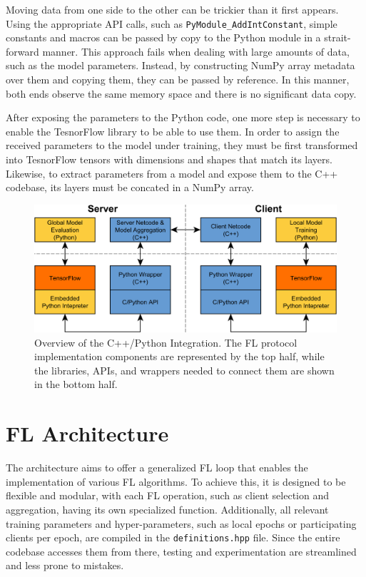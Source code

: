 Moving data from one side to the other can be trickier than it first appears. Using the appropriate API calls, such as \texttt{PyModule\_AddIntConstant}, simple constants and macros can be passed by copy to the Python module in a strait-forward manner. This approach fails when dealing with large amounts of data, such as the model parameters. Instead, by constructing NumPy array metadata over them and copying them, they can be passed by reference. In this manner, both ends observe the same memory space and there is no significant data copy.

After exposing the parameters to the Python code, one more step is necessary to enable the TesnorFlow library to be able to use them. In order to assign the received parameters to the model under training, they must be first transformed into TesnorFlow tensors with dimensions and shapes that match its layers. Likewise, to extract parameters from a model and expose them to the C++ codebase, its layers must be concated in a NumPy array.


\begin{figure}[H]
    \centering
        \includegraphics[width=1\textwidth]{Images/block_diagrams/model_lifecycle.png}
        \decoRule
        \caption[C++/Python Integration]{Overview of the C++/Python Integration. The FL protocol implementation components are represented by the top half, while the libraries, APIs, and wrappers needed to connect them are shown in the bottom half.}
        \label{fig:model_lifecycle}
\end{figure}

\section{FL Architecture}\label{sec:FL_architecture}
The architecture aims to offer a generalized FL loop that enables the implementation of various FL algorithms. To achieve this, it is designed to be flexible and modular, with each FL operation, such as client selection and aggregation, having its own specialized function. Additionally, all relevant training parameters and hyper-parameters, such as local epochs or participating clients per epoch, are compiled in the \texttt{definitions.hpp} file. Since the entire codebase accesses them from there, testing and experimentation are streamlined and less prone to mistakes.

